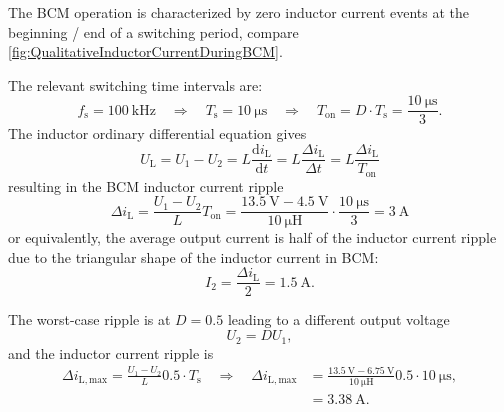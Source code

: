 \begin{solutionblock}
	The BCM operation is characterized by zero inductor current events at the beginning / end of a switching period, compare \autoref{fig:QualitativeInductorCurrentDuringBCM}.

	

	The relevant switching time intervals are:
	\begin{equation}
		f_\mathrm{s} = \SI{ 100}{\kilo\hertz} \quad \Rightarrow \quad T_\mathrm{s} = \SI{ 10}{\micro\second} \quad \Rightarrow \quad T_\mathrm{on} = D \cdot T_\mathrm{s} = \frac{\SI{ 10}{\micro \second}}{3}.
	\end{equation}
	The inductor ordinary differential equation gives
	\begin{equation}
		U_\mathrm{L} = U_\mathrm{1} - U_\mathrm{2} = L \frac{\mathrm{d} i_\mathrm{L}}{\mathrm{d}t}  = L \frac{\Delta i_\mathrm{L}}{\Delta t} = L \frac{\Delta i_\mathrm{L}}{T_\mathrm{on}}
	\end{equation}
	resulting in the BCM inductor current ripple
	\begin{equation}
		\Delta i_\mathrm{L} = \frac{U_\mathrm{1} - U_\mathrm{2}}{L} T_\mathrm{on} = \frac{\SI{13.5}{\volt} - \SI{4.5}{\volt}}{\SI{10}{\micro \henry}}\cdot \frac{\SI{10}{\micro \second}}{3} = \SI{3}{\ampere}
	\end{equation}
	or equivalently, the average output current is half of the inductor current ripple due to the triangular shape of the inductor current in BCM:
	\begin{equation}
		I_{\mathrm{2}} = \frac{\Delta i_\mathrm{L}}{2} = \SI{1.5}{\ampere}.
	\end{equation}
\end{solutionblock}

\begin{solutionblock}
	The worst-case ripple is at $D=0.5$ leading to a different output voltage
	\begin{equation}
		U_\mathrm{2} = D U_\mathrm{1},
	\end{equation}
	and the inductor current ripple is
	\begin{equation}
		\begin{split}
			\Delta i_\mathrm{L,max} = \frac{U_\mathrm{1} - U_\mathrm{2}}{L} 0.5 \cdot T_\mathrm{s}
			\quad\Rightarrow \quad\Delta i_\mathrm{L,max} & = \frac{\SI{13.5}{\volt} - \SI{6.75}{\volt}}{\SI{10}{\micro \henry}} 0.5 \cdot \SI{10}{\micro \second}, \\
			                                              & = \SI{3.38}{\ampere}.
		\end{split}
	\end{equation}
\end{solutionblock}

